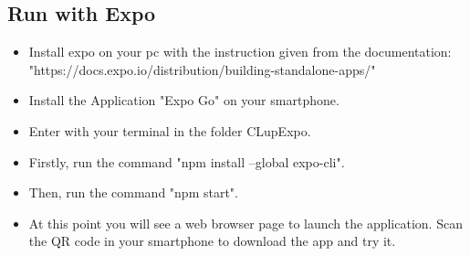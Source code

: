 \subsection{Run with Expo}
\begin{itemize}
\item Install expo on your pc with the instruction given from the documentation: 
"https://docs.expo.io/distribution/building-standalone-apps/"
\item Install the Application "Expo Go" on your smartphone.
\item Enter with your terminal in the folder CLupExpo.
\item Firstly, run the command "npm install --global expo-cli".
\item Then, run the command "npm start".
\item At this point you will see a web browser page to launch the application. Scan the QR code in your smartphone to download the app and try it.
\end{itemize}

 